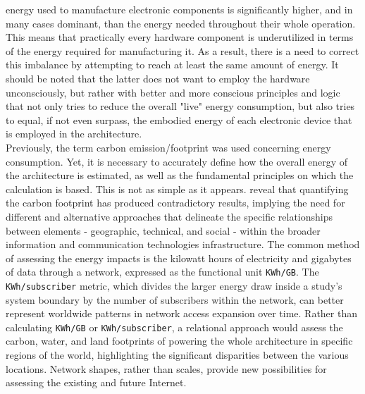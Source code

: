 energy used to manufacture electronic components is significantly higher, and in
many cases dominant, than the energy needed throughout their whole operation\cite{monster_footprint}.
This means that practically every hardware component is underutilized in terms of
the energy required for manufacturing it. As a result, there is a need to correct
this imbalance by attempting to reach at least the same amount of energy. It
should be noted that the latter does not want to employ the hardware
unconsciously, but rather with better and more conscious principles and logic that
not only tries to reduce the overall "live" energy consumption, but also tries
to equal, if not even surpass, the embodied energy of each electronic device
that is employed in the architecture. \\ %
Previously, the term carbon emission/footprint was used concerning energy consumption.
Yet, it is necessary to accurately define how the overall energy of the architecture
is estimated, as well as the fundamental principles on which the calculation is
based. This is not as simple as it appears. \cite{world_wide_web_carbon} reveal
that quantifying the carbon footprint has produced contradictory results, implying
the need for different and alternative approaches that delineate the specific relationships
between elements - geographic, technical, and social - within the broader information
and communication technologies infrastructure. The common method of assessing
the energy impacts is the kilowatt hours of electricity and gigabytes of data
through a network, expressed as the functional unit \texttt{KWh/GB}. The \texttt{KWh/subscriber}
metric, which divides the larger energy draw inside a study's system boundary by
the number of subscribers within the network, can better represent worldwide
patterns in network access expansion over time. Rather than calculating \texttt{KWh/GB}
or \texttt{KWh/subscriber}, a relational approach would assess the carbon, water,
and land footprints of powering the whole architecture in specific regions of
the world, highlighting the significant disparities between the various locations.
Network shapes, rather than scales, provide new possibilities for assessing the
existing and future Internet\cite{world_wide_web_carbon}. \\ %

